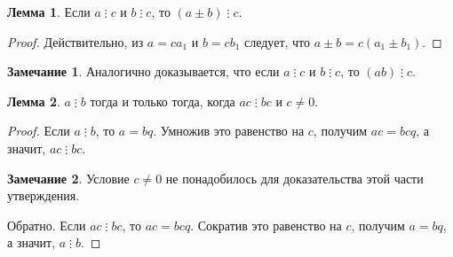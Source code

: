 \documentclass[14pt, a4paper]{extarticle}
\theoremstyle{definition}
\newtheorem{lemma}{Лемма}
\newtheorem*{remark}{Замечание}
\newcommand{\divisible}{\mathop{\vdots}}
\begin{document}
	\begin{lemma}
	\label{sum}
		Если $a\divisible c$ и $b\divisible c$, то $(a\pm b)\divisible c$.
	\end{lemma}
	\begin{proof}
		Действительно, из $a=ca_1$ и $b=cb_1$ следует, что $a\pm b=c(a_1\pm b_1)$.
	\end{proof}

	\begin{remark}
		Аналогично доказывается, что если $a\divisible c$ и $b\divisible c$, то $(ab)\divisible c$.
	\end{remark}

	\begin{lemma}
	\label{sokr}
		$a\divisible b$ тогда и только тогда, когда $ac\divisible bc$ и $c\neq0$.
	\end{lemma}
	\begin{proof}
		Если $a\divisible b$, то $a=bq$. Умножив это равенство на $c$, получим $ac=bcq$, а значит, $ac\divisible bc$.

		\begin{remark}
			Условие $c\neq0$ не понадобилось для доказательства этой части утверждения.
		\end{remark}

		Обратно. Если $ac\divisible bc$, то $ac=bcq$. Сократив это равенство на $c$, получим $a=bq$, а значит, $a\divisible b$.
	\end{proof}
\end{document}
